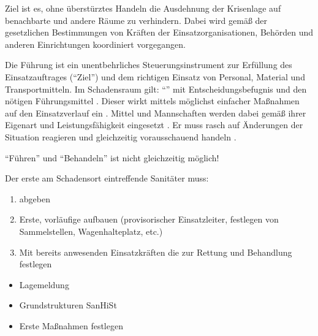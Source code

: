{%
\label{topic:einsatzgrundsaetze}%
Ziel ist es, ohne überstürztes Handeln die Ausdehnung der
Krisenlage auf benachbarte und andere Räume zu verhindern.
Dabei wird gemäß der gesetzlichen Bestimmungen von Kräften
der Einsatzorganisationen, Behörden und anderen
Einrichtungen koordiniert vorgegangen.
}

\begin{Synopsis}
\end{Synopsis}

{%
\label{topic:katastrophe-fuehrung}%
Die Führung ist ein unentbehrliches Steuerungsinstrument zur
Erfüllung des Einsatzauftrages
(\enquote{Ziel}) und dem richtigen
Einsatz von Personal, Material und Transportmitteln. Im Schadensraum gilt:
\enquote{} mit
Entscheidungsbefugnis und den nötigen Führungsmittel
.
Dieser wirkt mittels möglichst einfacher Ma{\ss}nahmen
 auf den
Einsatzverlauf ein
.
Mittel und Mannschaften werden dabei gemäß ihrer Eigenart
und Leistungsfähigkeit eingesetzt
.
Er muss rasch auf Änderungen der Situation reagieren
 und
gleichzeitig vorausschauend handeln
.
}

\begin{Danger}
  \item \enquote{Führen} und
  \enquote{Behandeln} ist nicht gleichzeitig
  möglich!
\end{Danger}

{%
Der erste am Schadensort eintreffende Sanitäter muss:

\begin{enumerate}
    \item {} abgeben
    \item Erste, vorläufige 
    aufbauen (provisorischer Einsatzleiter,
    festlegen von Sammelstellen, Wagenhalteplatz, etc.)
    \item Mit bereits anwesenden Einsatzkräften die  zur Rettung und Behandlung festlegen
\end{enumerate}
}
{%
\begin{itemize}
  \item Lagemeldung
  \item Grundstrukturen SanHiSt
  \item Erste Maßnahmen festlegen
\end{itemize}
}

